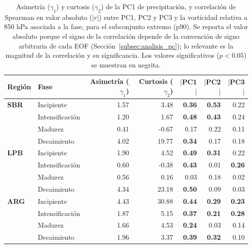 \begin{table}[htbp]
\centering
\caption[Momentos estadísticos y correlación de PC1--PC3 de precipitación - Subconjunto p90]
{Asimetría ($\gamma_1$) y curtosis ($\gamma_2$) de la PC1 de precipitación, y correlación de Spearman en valor absoluto ($|r|$) entre PC1, PC2 y PC3 y la vorticidad relativa a 850 hPa asociada a la fase, para el subconjunto extremo (p90). Se reporta el valor absoluto porque el signo de la correlación depende de la convención de signo arbitraria de cada EOF (Sección~\ref{subsec:analisis_pc}); lo relevante es la magnitud de la correlación y su significancia. Los valores significativos ($p<0.05$) se muestran en negrita.}
\label{tab:stat_p90_tp}
\begin{tabular*}{\textwidth}{@{\extracolsep{\fill}}llrrrrr}
\hline
\textbf{Región} & \textbf{Fase} & \textbf{Asimetría ($\gamma_1$)} & \textbf{Curtosis ($\gamma_2$)} & \textbf{$|$PC1$|$} & \textbf{$|$PC2$|$} & \textbf{$|$PC3$|$} \\
\hline
\textbf{SBR} & Incipiente       & 1.57 & 3.48  & \textbf{0.36} & \textbf{0.53} & 0.22 \\
             & Intensificación & 1.20 & 1.67  & \textbf{0.48} & \textbf{0.43} & 0.24 \\
             & Madurez         & 0.41 & -0.67 & 0.17 & 0.22 & 0.11 \\
             & Decaimiento     & 4.02 & 19.77 & \textbf{0.34} & 0.17 & 0.18 \\
\hline
\textbf{LPB} & Incipiente       & 1.90 & 4.52  & \textbf{0.49} & \textbf{0.31} & 0.22 \\
             & Intensificación & 0.60 & -0.38 & \textbf{0.43} & 0.01 & \textbf{0.26} \\
             & Madurez         & 0.56 & 0.16  & 0.03 & 0.18 & 0.02 \\
             & Decaimiento     & 4.34 & 23.18 & \textbf{0.50} & 0.09 & 0.03 \\
\hline
\textbf{ARG} & Incipiente       & 4.43 & 30.88 & \textbf{0.44} & \textbf{0.29} & \textbf{0.23} \\
             & Intensificación & 1.87 & 5.15  & \textbf{0.37} & \textbf{0.21} & \textbf{0.28} \\
             & Madurez         & 1.66 & 4.53  & \textbf{0.24} & 0.03 & 0.14 \\
             & Decaimiento     & 1.96 & 3.37  & \textbf{0.39} & \textbf{0.32} & 0.10 \\
\hline
\end{tabular*}
\end{table}
